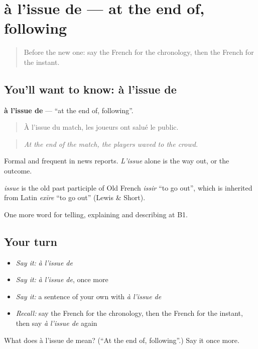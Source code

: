 \section[à l'issue de]{à l'issue de — at the end of, following}

\label{lesson:FR-C277-a-l-issue-de}



\begin{quote}
Before the new one: say the French for the chronology, then the French for the instant.
\end{quote}

\subsection*{You'll want to know: à l'issue de}
\textbf{à l'issue de} — \textquotedblleft{}at the end of, following\textquotedblright{}.

\begin{quote}
À l'issue du match, les joueurs ont salué le public.
\end{quote}

\begin{quote}
\emph{At the end of the match, the players waved to the crowd.}
\end{quote}

Formal and frequent in news reports. \emph{L'issue} alone is the way out, or the outcome.

\begin{cousinweb}
\emph{issue} is the old past participle of Old French \emph{issir} \textquotedblleft{}to go out\textquotedblright{}, which is inherited from Latin \emph{exīre} \textquotedblleft{}to go out\textquotedblright{} (Lewis \& Short).
\end{cousinweb}

\begin{grammarlens}[title={What you've built}]
One more word for telling, explaining and describing at B1.
\end{grammarlens}

\subsection*{Your turn}
\begin{itemize}
\raggedright
  \item \emph{Say it:} \emph{à l'issue de}
  \item \emph{Say it:} \emph{à l'issue de}, once more
  \item \emph{Say it:} a sentence of your own with \emph{à l'issue de}
  \item \emph{Recall:} say the French for the chronology, then the French for the instant, then say \emph{à l'issue de} again
\end{itemize}

\begin{tcolorbox}[breakable,colback=teal!4,colframe=teal!35!black,title={Before you move on}]
What does à l'issue de mean? (\textquotedblleft{}At the end of, following\textquotedblright{}.) Say it once more.
\end{tcolorbox}
